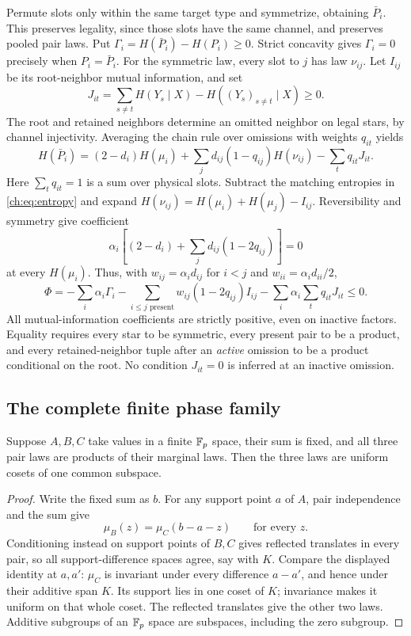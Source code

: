 Permute slots only within the same target type and symmetrize, obtaining $\bar P_i$. This preserves legality, since those slots have the same channel, and preserves pooled pair laws. Put $\Gamma_i=H(\bar P_i)-H(P_i)\ge0$. Strict concavity gives $\Gamma_i=0$ precisely when $P_i=\bar P_i$. For the symmetric law, every slot to $j$ has law $\nu_{ij}$. Let $I_{ij}$ be its root-neighbor mutual information, and set
\[
 J_{it}=\sum_{s\ne t}H(Y_s\mid X)-H((Y_s)_{s\ne t}\mid X)\ge0.
\]
The root and retained neighbors determine an omitted neighbor on legal stars, by channel injectivity. Averaging the chain rule over omissions with weights $q_{it}$ yields
\begin{equation}\label{ch:eq:localentropy}
 H(\bar P_i)=(2-d_i)H(\mu_i)
 +\sum_jd_{ij}(1-q_{ij})H(\nu_{ij})-\sum_tq_{it}J_{it}.
\end{equation}
Here $\sum_tq_{it}=1$ is a sum over physical slots. Subtract the matching entropies in \eqref{ch:eq:entropy} and expand $H(\nu_{ij})=H(\mu_i)+H(\mu_j)-I_{ij}$. Reversibility and symmetry give coefficient
\[
 \alpha_i\left[(2-d_i)+\sum_jd_{ij}(1-2q_{ij})\right]=0
\]
at every $H(\mu_i)$. Thus, with $w_{ij}=\alpha_id_{ij}$ for $i<j$ and $w_{ii}=\alpha_id_{ii}/2$,
\begin{equation}\label{ch:eq:identity}
 \Phi=-\sum_i\alpha_i\Gamma_i
 -\sum_{i\le j\text{ present}}w_{ij}(1-2q_{ij})I_{ij}
 -\sum_i\alpha_i\sum_tq_{it}J_{it}\le0.
\end{equation}
All mutual-information coefficients are strictly positive, even on inactive factors. Equality requires every star to be symmetric, every present pair to be a product, and every retained-neighbor tuple after an \emph{active} omission to be a product conditional on the root. No condition $J_{it}=0$ is inferred at an inactive omission.

\subsection{The complete finite phase family}
\begin{lemma}\label{ch:lem:triple}
Suppose $A,B,C$ take values in a finite $\mathbb F_p$ space, their sum is fixed, and all three pair laws are products of their marginal laws. Then the three laws are uniform cosets of one common subspace.
\end{lemma}
\begin{proof}
Write the fixed sum as $b$. For any support point $a$ of $A$, pair independence and the sum give
\[
 \mu_B(z)=\mu_C(b-a-z)\qquad\text{for every }z.
\]
Conditioning instead on support points of $B,C$ gives reflected translates in every pair, so all support-difference spaces agree, say with $K$. Compare the displayed identity at $a,a'$: $\mu_C$ is invariant under every difference $a-a'$, and hence under their additive span $K$. Its support lies in one coset of $K$; invariance makes it uniform on that whole coset. The reflected translates give the other two laws. Additive subgroups of an $\mathbb F_p$ space are subspaces, including the zero subgroup.
\end{proof}

